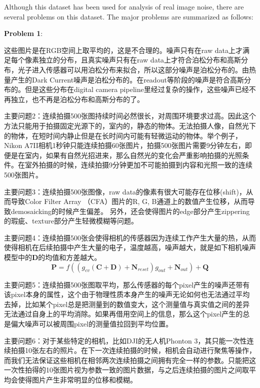 \documentclass[10pt,twocolumn,letterpaper]{article}
\begin{document}
Although this dataset has been used for analysis of real image noise, there are several problems on this dataset. The major problems are summarized as follows:

\textbf{Problem 1}:


这些图片是在RGB空间上取平均的，这是不合理的。噪声只有在raw data上才满足每个像素独立的分布，且真实噪声只有在raw data上才符合泊松分布和高斯分布，光子进入传感器可以用泊松分布来拟合，所以这部分噪声是泊松分布的。由热量产生的Dark Current噪声是泊松分布的。在readout等阶段的噪声是符合高斯分布的。但是这些分布在digital camera pipeline里经过复杂的操作，这些噪声已经不再独立，也不再是泊松分布和高斯分布的了。

主要问题2：连续拍摄500张图持续时间必然很长，对周围环境要求过高。因此这个方法只能用于拍摄固定光源下的，室内的，静态的物体。无法拍摄人像，自然光下的物体，在短时间内静止但是在长时间内可能有轻微运动的物体。举个例子，Nikon A7II相机1秒钟只能连续拍摄60张图片，拍摄500张图片需要9分钟左右，即便是在室内，如果有自然光招进来，那么自然光的变化会严重影响拍摄的光照条件。在室外拍摄的时候，连续拍摄9分钟更加不可能拍摄到内容和光照一致的连续500张图片。

主要问题3：连续拍摄500张图像，raw data的像素有很大可能存在位移(shift)，从而导致Color Filter Array （CFA）图片的R, G, B通道上的数值产生位移，从而导致demosaicking的时候产生偏差。 另外，还会使得图片的edge部分产生zippering的瑕疵、texture部分产生轻微模糊等问题。

主要问题4：连续拍摄500张会使得相机的传感器因为连续工作产生大量的热，从而使得相机在后续拍摄中产生大量的电子，温度越高，噪声越大，就是如下相机噪声模型中的$\bm{D}$的均值和方差越大。
\begin{equation}
\bm{P} = f((g_{cv}(\bm{C}+\bm{D})+\bm{N}_{reset})g_{out}+\bm{N}_{out})+\bm{Q}
\end{equation}

主要问题5：连续拍摄500张图取平均，那么传感器的每个pixel产生的噪声还带有该pixel本身的属性，这个由于物理性质本身产生的噪声无论如何也无法通过平均去掉，比如某个pixel总是把测量到的数值变大，这个测量值与真实值之间的差异无法通过自身上的平均消除。如果再借用空间上的信息，那么这个pixel产生的总是偏大噪声可以被周围pixel的测量值拉回到平均位置。


主要问题6：对于某些特定的相机，比如DJI的无人机Phonton 3，其只能一次性连续拍摄10张左右的照片。在下一次连续拍摄的时候，相机会自动进行聚焦等操作，而我们无法保证这些相机在相邻两次连续拍摄之间拥有完全一样的参数。只能把这一次性拍得的10张图片视为参数一致的图片数据，与之后连续拍摄的图片之间取平均会使得图片产生非常明显的位移和模糊。
\end{document}
